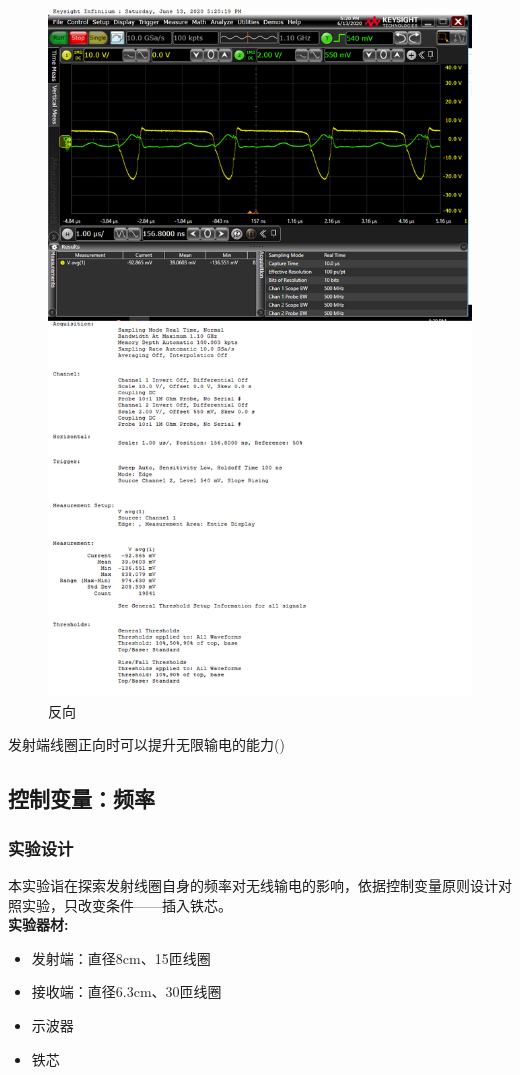 \documentclass[conference]{IEEEtran}
\theoremstyle{break}
\begin{document}
\begin{figure}[htbp]
        \centerline{\includegraphics[scale=0.1]{电压结论2.png}}
        \caption{反向}
        \label{fig}
        \end{figure}
发射端线圈正向时可以提升无限输电的能力()

\subsection{控制变量：频率}
\subsubsection{实验设计}
本实验诣在探索发射线圈自身的频率对无线输电的影响，依据控制变量原则设计对照实验，只改变条件——插入铁芯。 \\
\textbf{实验器材:}
\begin{itemize}
        \item 发射端：直径8cm、15匝线圈
        \item 接收端：直径6.3cm、30匝线圈
        \item 示波器
        \item 铁芯
\end{itemize}
\end{document}

